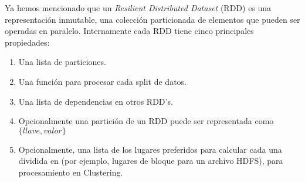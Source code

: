   Ya hemos mencionado que un \emph{Resilient Distributed Dataset} (RDD) es una representación inmutable, una colección particionada de elementos que pueden ser operadas en paralelo. Internamente cada RDD tiene cinco principales propiedades:


  \begin{enumerate}
    \item Una lista de particiones.
    \item Una función para procesar cada split de datos.
    \item Una lista de dependencias en otros RDD's. 
    \item Opcionalmente una partición de un RDD puede ser representada como $\{llave,valor\}$ 

    \item Opcionalmente, una lista de los lugares preferidos para calcular cada una dividida en (por ejemplo, lugares de bloque para un archivo HDFS), para procesamiento en Clustering.

  \end{enumerate}




















